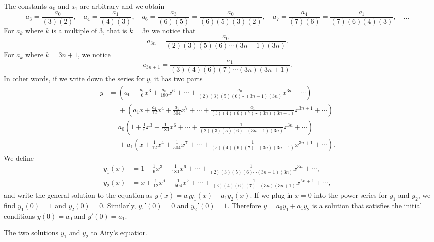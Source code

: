 \documentclass{ximera}
\begin{document}
\begin{exampleSol}
    The constants $a_0$ and $a_1$ are arbitrary and we obtain
    \begin{equation*}
        a_3 = \frac{a_0}{(3)(2)}, \quad a_4 = \frac{a_1}{(4)(3)}, \quad a_6 = \frac{a_3}{(6)(5)} = \frac{a_0}{(6)(5)(3)(2)}, \quad a_7 = \frac{a_4}{(7)(6)} = \frac{a_1}{(7)(6)(4)(3)}, \quad \ldots
    \end{equation*}
    For $a_k$ where $k$ is a multiple of $3$, that is $k=3n$ we notice that
    \begin{equation*}
        a_{3n} = \frac{a_0}{(2)(3)(5)(6) \cdots (3n-1)(3n)} .
    \end{equation*}
    For $a_k$ where $k = 3n+1$, we notice
    \begin{equation*}
        a_{3n+1} = \frac{a_1}{(3)(4)(6)(7) \cdots (3n)(3n+1)} .
    \end{equation*}
    In other words, if we write down the series for $y$, it has two parts
    \begin{equation*}
        \begin{split}
            y &=
            \left( a_0 + \frac{a_0}{6} x^3 + \frac{a_0}{180} x^6 + \cdots + \frac{a_0}{(2)(3)(5)(6) \cdots (3n-1)(3n)} x^{3n} + \cdots \right) \\
            &\phantom{=} +
            \left( a_1 x + \frac{a_1}{12} x^4 + \frac{a_1}{504} x^7 + \cdots + \frac{a_1}{(3)(4)(6)(7) \cdots (3n)(3n+1)} x^{3n+1} + \cdots \right) \\
            & = a_0
            \left( 1 + \frac{1}{6} x^3 + \frac{1}{180} x^6 + \cdots + \frac{1}{(2)(3)(5)(6) \cdots (3n-1)(3n)} x^{3n} + \cdots \right) \\
            &\phantom{=} + a_1
            \left( x + \frac{1}{12} x^4 + \frac{1}{504} x^7 + \cdots + \frac{1}{(3)(4)(6)(7) \cdots (3n)(3n+1)} x^{3n+1} + \cdots \right) .
        \end{split}
    \end{equation*}
    We define
    \begin{align*}
        y_1(x) &= 1 + \frac{1}{6} x^3 + \frac{1}{180} x^6 + \cdots + \frac{1}{(2)(3)(5)(6) \cdots (3n-1)(3n)} x^{3n} + \cdots, \\
        y_2(x) &=  x + \frac{1}{12} x^4 + \frac{1}{504} x^7 + \cdots + \frac{1}{(3)(4)(6)(7) \cdots (3n)(3n+1)} x^{3n+1} + \cdots ,
    \end{align*}
    and write the general solution to the equation as $y(x)= a_0 y_1(x) + a_1 y_2(x)$.  If we plug in $x=0$ into the power series for $y_1$ and $y_2$, we find $y_1(0) = 1$ and $y_2(0) = 0$.  Similarly, $y_1'(0) = 0$ and $y_2'(0) = 1$.  Therefore $y = a_0 y_1 + a_1 y_2$ is a solution that satisfies the initial conditions $y(0) = a_0$ and $y'(0) = a_1$.
    
    \begin{myfig}
        \capstart
        \caption{The two solutions $y_1$ and $y_2$ to Airy's equation.\label{ps:airyfig}}
    \end{myfig}
\end{exampleSol}
\end{document}

